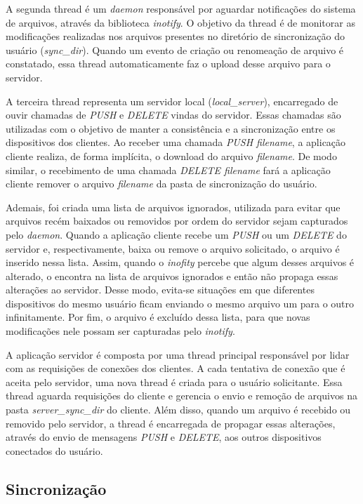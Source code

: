 \documentclass[a4paper]{article}
\begin{document}
A segunda thread é um \textit{daemon} responsável por aguardar notificações do sistema de arquivos, através da biblioteca \textit{inotify}. O objetivo da thread é de monitorar as modificações realizadas nos arquivos presentes no diretório de sincronização do usuário (\textit{sync\_dir}). Quando um evento de criação ou renomeação de arquivo é constatado, essa thread automaticamente faz o upload desse arquivo para o servidor.

A terceira thread representa um servidor local (\textit{local\_server}), encarregado de ouvir chamadas de \textit{PUSH} e \textit{DELETE} vindas do servidor. Essas chamadas são utilizadas com o objetivo de manter a consistência e a sincronização entre os dispositivos dos clientes. Ao receber uma chamada \textit{PUSH filename}, a aplicação cliente realiza, de forma implícita, o download do arquivo \textit{filename}. De modo similar, o recebimento de uma chamada \textit{DELETE filename} fará a aplicação cliente remover o arquivo \textit{filename} da pasta de sincronização do usuário.

Ademais, foi criada uma lista de arquivos ignorados, utilizada para evitar que arquivos recém baixados ou removidos por ordem do servidor sejam capturados pelo \textit{daemon}. Quando a aplicação cliente recebe um \textit{PUSH} ou um \textit{DELETE} do servidor e, respectivamente, baixa ou remove o arquivo solicitado, o arquivo é inserido nessa lista. Assim, quando o \textit{inofity} percebe que algum desses arquivos é alterado, o encontra na lista de arquivos ignorados e então não propaga essas alterações ao servidor. Desse modo, evita-se situações em que diferentes dispositivos do mesmo usuário ficam enviando o mesmo arquivo um para o outro infinitamente. Por fim, o arquivo é excluído dessa lista, para que novas modificações nele possam ser capturadas pelo \textit{inotify}.

A aplicação servidor é composta por uma thread principal responsável por lidar com as requisições de conexões dos clientes. A cada tentativa de conexão que é aceita pelo servidor, uma nova thread é criada para o usuário solicitante. Essa thread aguarda requisições do cliente e gerencia o envio e remoção de arquivos na pasta \textit{server\_sync\_dir} do cliente. Além disso, quando um arquivo é recebido ou removido pelo servidor, a thread é encarregada de propagar essas alterações, através do envio de mensagens \textit{PUSH} e \textit{DELETE}, aos outros dispositivos conectados do usuário.

\subsection{Sincronização}
\end{document}
